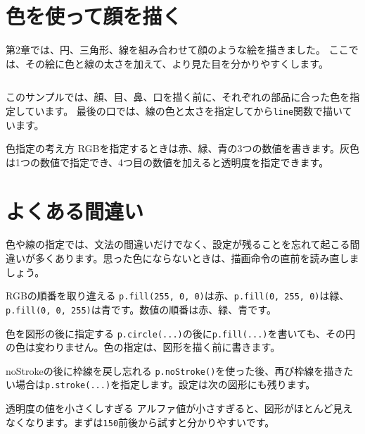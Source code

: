 \section{色を使って顔を描く}

第2章では、円、三角形、線を組み合わせて顔のような絵を描きました。
ここでは、その絵に色と線の太さを加えて、より見た目を分かりやすくします。

\begin{listing}[htbp]
\inputminted{ts}{typescript-p5/listings/chapter03/colored-face.ts}
\caption{色と線を使って顔を描く（\texttt{chapter03/colored-face.ts}）}
\label{lst:chapter03-colored-face}
\end{listing}

このサンプルでは、顔、目、鼻、口を描く前に、それぞれの部品に合った色を指定しています。
最後の口では、線の色と太さを指定してから\texttt{line}関数で描いています。

\begin{pointbox}{色指定の考え方}
RGBを指定するときは赤、緑、青の3つの数値を書きます。灰色は1つの数値で指定でき、4つ目の数値を加えると透明度を指定できます。
\end{pointbox}

\section{よくある間違い}

色や線の指定では、文法の間違いだけでなく、設定が残ることを忘れて起こる間違いが多くあります。思った色にならないときは、描画命令の直前を読み直しましょう。

\begin{mistakebox}{RGBの順番を取り違える}
\texttt{p.fill(255, 0, 0)}は赤、\texttt{p.fill(0, 255, 0)}は緑、\texttt{p.fill(0, 0, 255)}は青です。数値の順番は赤、緑、青です。
\end{mistakebox}

\begin{mistakebox}{色を図形の後に指定する}
\texttt{p.circle(...)}の後に\texttt{p.fill(...)}を書いても、その円の色は変わりません。色の指定は、図形を描く前に書きます。
\end{mistakebox}

\begin{mistakebox}{noStrokeの後に枠線を戻し忘れる}
\texttt{p.noStroke()}を使った後、再び枠線を描きたい場合は\texttt{p.stroke(...)}を指定します。設定は次の図形にも残ります。
\end{mistakebox}

\begin{mistakebox}{透明度の値を小さくしすぎる}
アルファ値が小さすぎると、図形がほとんど見えなくなります。まずは\texttt{150}前後から試すと分かりやすいです。
\end{mistakebox}

